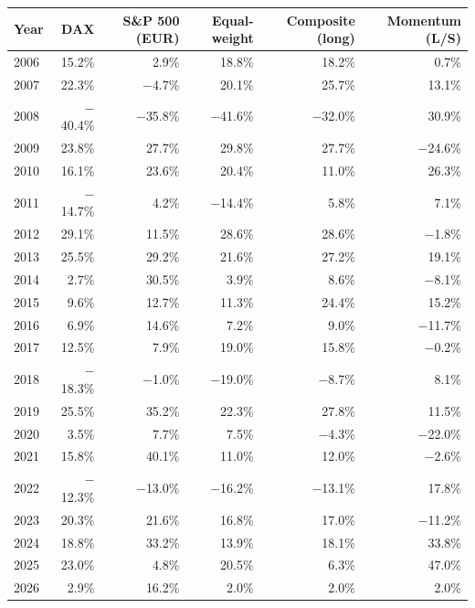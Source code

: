 \begin{tabular}{lrrrrr}
\toprule
Year & DAX & S\&P 500 (EUR) & Equal-weight & Composite (long) & Momentum (L/S) \\
\midrule
2006 & 15.2\% & 2.9\% & 18.8\% & 18.2\% & 0.7\% \\
2007 & 22.3\% & $-$4.7\% & 20.1\% & 25.7\% & 13.1\% \\
2008 & $-$40.4\% & $-$35.8\% & $-$41.6\% & $-$32.0\% & 30.9\% \\
2009 & 23.8\% & 27.7\% & 29.8\% & 27.7\% & $-$24.6\% \\
2010 & 16.1\% & 23.6\% & 20.4\% & 11.0\% & 26.3\% \\
2011 & $-$14.7\% & 4.2\% & $-$14.4\% & 5.8\% & 7.1\% \\
2012 & 29.1\% & 11.5\% & 28.6\% & 28.6\% & $-$1.8\% \\
2013 & 25.5\% & 29.2\% & 21.6\% & 27.2\% & 19.1\% \\
2014 & 2.7\% & 30.5\% & 3.9\% & 8.6\% & $-$8.1\% \\
2015 & 9.6\% & 12.7\% & 11.3\% & 24.4\% & 15.2\% \\
2016 & 6.9\% & 14.6\% & 7.2\% & 9.0\% & $-$11.7\% \\
2017 & 12.5\% & 7.9\% & 19.0\% & 15.8\% & $-$0.2\% \\
2018 & $-$18.3\% & $-$1.0\% & $-$19.0\% & $-$8.7\% & 8.1\% \\
2019 & 25.5\% & 35.2\% & 22.3\% & 27.8\% & 11.5\% \\
2020 & 3.5\% & 7.7\% & 7.5\% & $-$4.3\% & $-$22.0\% \\
2021 & 15.8\% & 40.1\% & 11.0\% & 12.0\% & $-$2.6\% \\
2022 & $-$12.3\% & $-$13.0\% & $-$16.2\% & $-$13.1\% & 17.8\% \\
2023 & 20.3\% & 21.6\% & 16.8\% & 17.0\% & $-$11.2\% \\
2024 & 18.8\% & 33.2\% & 13.9\% & 18.1\% & 33.8\% \\
2025 & 23.0\% & 4.8\% & 20.5\% & 6.3\% & 47.0\% \\
2026 & 2.9\% & 16.2\% & 2.0\% & 2.0\% & 2.0\% \\
\bottomrule
\end{tabular}
